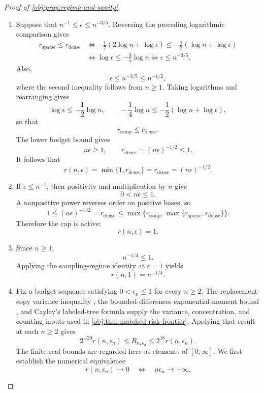 \documentclass[11pt]{article}
\begin{document}
\begin{proof}[Proof of \cref{obj:prop:regime-and-sanity}]
\begin{enumerate}
\item Suppose that \(n^{-1}\le\epsilon\le n^{-3/5}\).
Reversing the preceding logarithmic comparison gives
\[
\begin{aligned}
r_{\mathrm{sparse}}\le r_{\mathrm{dense}}
&\iff
-\frac17(2\log n+\log\epsilon)
\le-\frac12(\log n+\log\epsilon)\\
&\iff \log\epsilon\le-\frac35\log n
\iff \epsilon\le n^{-3/5}.
\end{aligned}
\]
Also,
\[
\epsilon\le n^{-3/5}\le n^{-1/2},
\]
where the second inequality follows from \(n\ge1\).
Taking logarithms and rearranging gives
\[
\log\epsilon\le-\frac12\log n,
\qquad
-\frac14\log n
\le-\frac12(\log n+\log\epsilon),
\]
so that
\[
r_{\mathrm{samp}}\le r_{\mathrm{dense}}.
\]
The lower budget bound gives
\[
n\epsilon\ge1,
\qquad
r_{\mathrm{dense}}=(n\epsilon)^{-1/2}\le1.
\]
It follows that
\[
r(n,\epsilon)
=\min\{1,r_{\mathrm{dense}}\}
=r_{\mathrm{dense}}
=(n\epsilon)^{-1/2}.
\]

\item If \(\epsilon\le n^{-1}\), then positivity and multiplication by \(n\) give
\[
0<n\epsilon\le1.
\]
A nonpositive power reverses order on positive bases, so
\[
1\le(n\epsilon)^{-1/2}
=r_{\mathrm{dense}}
\le\max\{r_{\mathrm{samp}},
             \max\{r_{\mathrm{sparse}},r_{\mathrm{dense}}\}\}.
\]
Therefore the cap is active:
\[
r(n,\epsilon)=1.
\]

\item Since \(n\ge1\),
\[
n^{-1/4}\le1.
\]
Applying the sampling-regime identity at \(\epsilon=1\) yields
\[
r(n,1)=n^{-1/4}.
\]

\item Fix a budget sequence satisfying \(0<\epsilon_n\le1\) for every \(n\ge2\).
The replacement-copy variance inequality
\citep[Theorem 3.1, printed p.~54]{BoucheronLugosiMassart2013},
the bounded-differences exponential-moment bound
\citep[Theorem 6.2, displayed log-mgf conclusion in its proof, printed p.~167]{BoucheronLugosiMassart2013},
and Cayley's labeled-tree formula
\citep[Section 5.6, Theorem 5.40]{KellerTrotterAppliedCombinatorics}
supply the variance, concentration, and counting inputs used in
\cref{obj:thm:matched-risk-frontier}. Applying that result at each \(n\ge2\) gives
\[
2^{-20}r(n,\epsilon_n)
\le R_{n,\epsilon_n}
\le2^{18}r(n,\epsilon_n).
\]
The finite real bounds are regarded here as elements of \([0,\infty]\).
We first establish the numerical equivalence
\[
r(n,\epsilon_n)\longrightarrow0
\quad\Longleftrightarrow\quad
n\epsilon_n\longrightarrow+\infty.
\]


\end{enumerate}
\end{proof}
\end{document}

